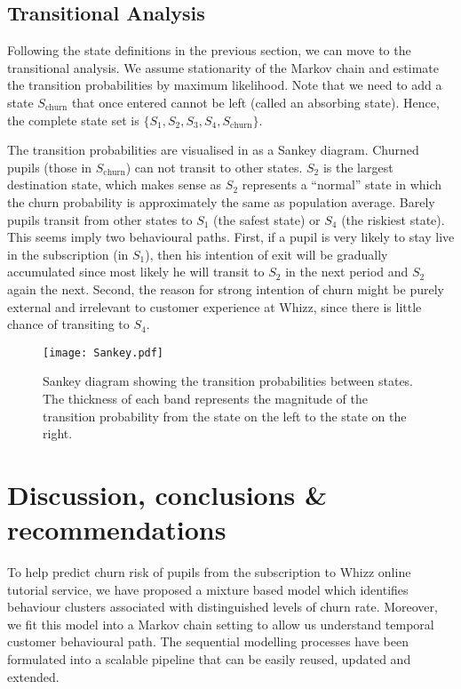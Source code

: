 \documentclass[english,a4,oneside,9pt]{extarticle}
\begin{document}
\subsection*{Transitional Analysis}

Following the state definitions in the previous section, we can move to the transitional analysis. We assume stationarity of the Markov chain and estimate the transition probabilities by maximum likelihood. Note that we need to add a state $S_\text{churn}$ that once entered cannot be left (called an absorbing state). Hence, the complete state set is $\{S_1, S_2, S_3, S_4, S_\text{churn}\}$.

The transition probabilities are visualised in  as a Sankey diagram. Churned pupils (those in $S_\text{churn}$) can not transit to other states. $S_2$ is the largest destination state, which makes sense as $S_2$ represents a ``normal'' state in which the churn probability is approximately the same as population average. Barely pupils transit from other states to $S_1$ (the safest state) or $S_4$ (the riskiest state). This seems imply two behavioural paths. First, if a pupil is very likely to stay live in the subscription (in $S_1$), then his intention of exit will be gradually accumulated since most likely he will transit to $S_2$ in the next period and $S_2$ again the next. Second, the reason for strong intention of churn might be purely external and irrelevant to customer experience at Whizz, since there is little chance of transiting to $S_4$.


\begin{figure}[htb]
\centering
\texttt{[image: Sankey.pdf]}
\caption{Sankey diagram showing the transition probabilities between states. The thickness of each band represents the magnitude of the transition probability from the state on the left to the state on the right.}
\label{fig:sankey}
\end{figure}

\vspace*{-3mm}
\section{Discussion, conclusions \& recommendations}

To help predict churn risk of pupils from the subscription to Whizz online tutorial service, we have proposed a mixture based model which identifies behaviour clusters associated with distinguished levels of churn rate. Moreover, we fit this model into a Markov chain setting to allow us understand temporal customer behavioural path. The sequential modelling processes have been formulated into a scalable pipeline that can be easily reused, updated and extended.
\end{document}

